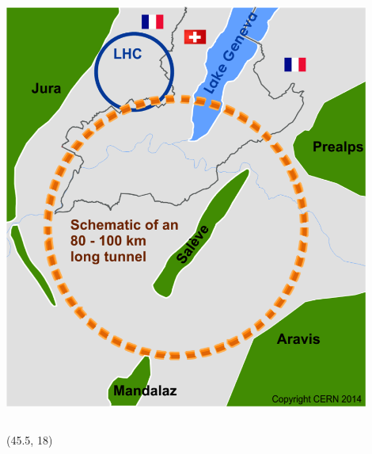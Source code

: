 \documentclass[final,xcolor={dvipsnames,svgnames,x11names,table}]{beamer}
\begin{document}
\begin{frame}
\begin{textblock}{44.5}
\begin{tcolorbox}[title=The Future Circular Collider Experiment (FCC)]
\begin{columns}
      \centering
      \includegraphics[width=0.9\textwidth]{Figures/cernFCC}
  \end{columns}

  \end{tcolorbox}
\end{textblock}

\begin{textblock}{38}(45.5, 18)
  \begin{tcolorbox}[title=FCCSW: simulation software for FCC]


\end{tcolorbox}
\end{textblock}
\end{frame}
\end{document}
